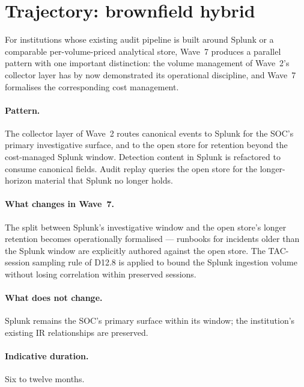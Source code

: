\section{Trajectory: brownfield hybrid}
\label{sec:w7-brownfield-hybrid}

For institutions whose existing audit pipeline is built around
Splunk or a comparable per-volume-priced analytical store,
Wave~7 produces a parallel pattern with one important
distinction: the volume management of Wave~2's collector layer
has by now demonstrated its operational discipline, and Wave~7
formalises the corresponding cost management.

\paragraph{Pattern.} The collector layer of Wave~2 routes
canonical events to Splunk for the SOC's primary investigative
surface, and to the open store for retention beyond the
cost-managed Splunk window. Detection content in Splunk is
refactored to consume canonical fields. Audit replay queries
the open store for the longer-horizon material that Splunk no
longer holds.

\paragraph{What changes in Wave~7.} The split between Splunk's
investigative window and the open store's longer retention
becomes operationally formalised --- runbooks for incidents
older than the Splunk window are explicitly authored against the
open store. The TAC-session sampling rule of D12.8 is applied
to bound the Splunk ingestion volume without losing correlation
within preserved sessions.

\paragraph{What does not change.} Splunk remains the SOC's
primary surface within its window; the institution's existing IR
relationships are preserved.

\paragraph{Indicative duration.} Six to twelve months.

